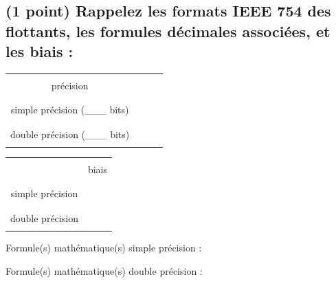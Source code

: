 \documentclass[11pt,a4paper]{article}
\begin{document}
\subsection{(1 point) Rappelez les formats IEEE 754 des flottants, les formules décimales associées, et les biais : }

\bigskip

\begin{center}
\begin{tabular}{c | C{2cm} | C{2.5cm} | C{3cm} }
 & & & \\
précision & & & \\
 & & & \\
\hline
 & & & \\
simple précision (\_\_\_ bits) & & \\
 & & & \\
\hline
 & & & \\
double précision (\_\_\_ bits) & & \\
 & & & \\
\end{tabular}
\end{center}

\bigskip

\begin{table}[!ht]
  \centering
  \begin{minipage}{0.40\textwidth}
    \centering

\begin{tabular}{| c | C{1.5cm} |}
\hline
 & \\
 & biais \\
 & \\
\hline
 & \\
simple précision & \\
 & \\
\hline
 & \\
double précision & \\
 & \\
\hline
\end{tabular}

  \end{minipage}
  \hfillx
  \begin{minipage}{0.60\textwidth}
    \centering

Formule(s) mathématique(s) simple précision :

\vspace*{2.5cm}

Formule(s) mathématique(s) double précision :

\vspace*{1.75cm}

  \end{minipage}
\end{table}
\end{document}
